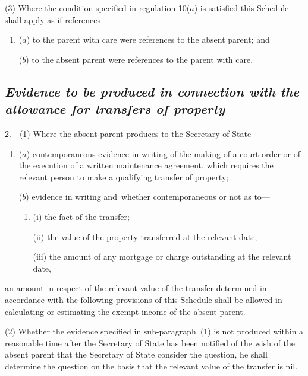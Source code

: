 \documentclass[12pt,a4paper]{article}
\begin{document}
(3) Where the condition specified in regulation 10($a$) is satisfied this Schedule shall apply as if references—
\begin{enumerate}\item[]
($a$) to the parent with care were references to the absent parent; and

($b$) to the absent parent were references to the parent with care.
\end{enumerate}


\subsection*{\sloppy\itshape Evidence to be produced in connection with the allowance for transfers of property}

2.—(1) Where the absent parent produces to the Secretary of State—
\begin{enumerate}\item[]
($a$) contemporaneous evidence in writing of the making of a court order or of the execution of a written maintenance agreement, which requires the relevant person to make a qualifying transfer of property;

($b$) evidence in writing and~whether contemporaneous or not as to—
\begin{enumerate}\item[]
(i) the fact of the transfer;

(ii) the value of the property transferred at the relevant date;

(iii) the amount of any mortgage or charge outstanding at the relevant date,
\end{enumerate}
\end{enumerate}
an amount in respect of the relevant value of the transfer determined in accordance with the following provisions of this Schedule shall be allowed in calculating or estimating the exempt income of the absent parent.

(2) Whether the evidence specified in sub-paragraph~(1) is not produced within a reasonable time after the Secretary of State has been notified of the wish of the absent parent that 
the Secretary of State  %
consider the question, 
he  %
shall determine the question on the basis that the relevant value of the transfer is nil.
\end{document}
